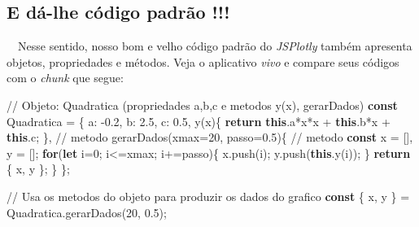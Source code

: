\documentclass[
  portuguese,
  letterpaper,
  DIV=11,
  numbers=noendperiod]{scrreprt}
\newenvironment{Shaded}{\begin{snugshade}}{\end{snugshade}}
\newcommand{\AttributeTok}[1]{\textcolor[rgb]{0.40,0.45,0.13}{#1}}
\newcommand{\CommentTok}[1]{\textcolor[rgb]{0.37,0.37,0.37}{#1}}
\newcommand{\ControlFlowTok}[1]{\textcolor[rgb]{0.00,0.23,0.31}{\textbf{#1}}}
\newcommand{\DataTypeTok}[1]{\textcolor[rgb]{0.68,0.00,0.00}{#1}}
\newcommand{\DecValTok}[1]{\textcolor[rgb]{0.68,0.00,0.00}{#1}}
\newcommand{\FloatTok}[1]{\textcolor[rgb]{0.68,0.00,0.00}{#1}}
\newcommand{\FunctionTok}[1]{\textcolor[rgb]{0.28,0.35,0.67}{#1}}
\newcommand{\KeywordTok}[1]{\textcolor[rgb]{0.00,0.23,0.31}{\textbf{#1}}}
\newcommand{\NormalTok}[1]{\textcolor[rgb]{0.00,0.23,0.31}{#1}}
\newcommand{\OperatorTok}[1]{\textcolor[rgb]{0.37,0.37,0.37}{#1}}
\begin{document}
\hfill\break

\subsection{E dá-lhe código padrão
!!!}\label{e-duxe1-lhe-cuxf3digo-padruxe3o}

~~Nesse sentido, nosso bom e velho código padrão do \emph{JSPlotly}
também apresenta objetos, propriedades e métodos. Veja o aplicativo
\emph{vivo} e compare seus códigos com o \emph{chunk} que segue:

\hfill\break

\hfill\break

\begin{Shaded}
\begin{Highlighting}[]
\CommentTok{// Objeto: Quadratica (propriedades a,b,c e metodos y(x), gerarDados)}
\KeywordTok{const}\NormalTok{ Quadratica }\OperatorTok{=}\NormalTok{ \{}
  \DataTypeTok{a}\OperatorTok{:} \OperatorTok{{-}}\FloatTok{0.2}\OperatorTok{,}
  \DataTypeTok{b}\OperatorTok{:} \FloatTok{2.5}\OperatorTok{,}
  \DataTypeTok{c}\OperatorTok{:} \FloatTok{0.5}\OperatorTok{,}
  \FunctionTok{y}\NormalTok{(x)\{ }\ControlFlowTok{return} \KeywordTok{this}\OperatorTok{.}\AttributeTok{a}\OperatorTok{*}\NormalTok{x}\OperatorTok{*}\NormalTok{x }\OperatorTok{+} \KeywordTok{this}\OperatorTok{.}\AttributeTok{b}\OperatorTok{*}\NormalTok{x }\OperatorTok{+} \KeywordTok{this}\OperatorTok{.}\AttributeTok{c}\OperatorTok{;}\NormalTok{ \}}\OperatorTok{,}     \CommentTok{// metodo}
  \FunctionTok{gerarDados}\NormalTok{(xmax}\OperatorTok{=}\DecValTok{20}\OperatorTok{,}\NormalTok{ passo}\OperatorTok{=}\FloatTok{0.5}\NormalTok{)\{                      }\CommentTok{// metodo}
    \KeywordTok{const}\NormalTok{ x }\OperatorTok{=}\NormalTok{ []}\OperatorTok{,}\NormalTok{ y }\OperatorTok{=}\NormalTok{ []}\OperatorTok{;}
    \ControlFlowTok{for}\NormalTok{(}\KeywordTok{let}\NormalTok{ i}\OperatorTok{=}\DecValTok{0}\OperatorTok{;}\NormalTok{ i}\OperatorTok{\textless{}=}\NormalTok{xmax}\OperatorTok{;}\NormalTok{ i}\OperatorTok{+=}\NormalTok{passo)\{ x}\OperatorTok{.}\FunctionTok{push}\NormalTok{(i)}\OperatorTok{;}\NormalTok{ y}\OperatorTok{.}\FunctionTok{push}\NormalTok{(}\KeywordTok{this}\OperatorTok{.}\FunctionTok{y}\NormalTok{(i))}\OperatorTok{;}\NormalTok{ \}}
    \ControlFlowTok{return}\NormalTok{ \{ x}\OperatorTok{,}\NormalTok{ y \}}\OperatorTok{;}
\NormalTok{  \}}
\NormalTok{\}}\OperatorTok{;}

\CommentTok{// Usa os metodos do objeto para produzir os dados do grafico}
\KeywordTok{const}\NormalTok{ \{ x}\OperatorTok{,}\NormalTok{ y \} }\OperatorTok{=}\NormalTok{ Quadratica}\OperatorTok{.}\FunctionTok{gerarDados}\NormalTok{(}\DecValTok{20}\OperatorTok{,} \FloatTok{0.5}\NormalTok{)}\OperatorTok{;}


\end{Highlighting}
\end{Shaded}
\end{document}
